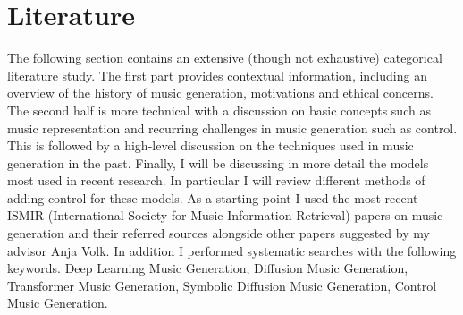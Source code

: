 

\chapter{Literature}
\label{chap:data}
\pagestyle{fancy}

The following section contains an extensive (though not exhaustive) categorical literature study. The first part provides contextual information, including an overview of the history of music generation, motivations and ethical concerns. The second half is more technical with a discussion on basic concepts such as music representation and recurring challenges in music generation such as control. This is followed by a high-level discussion on the techniques used in music generation in the past. Finally, I will be discussing in more detail the models most used in recent research. In particular I will review different methods of adding control for these models.  As a starting point I used the most recent ISMIR (International Society for Music Information Retrieval) papers on music generation and their referred sources alongside other papers suggested by my advisor Anja Volk. In addition I performed systematic searches with the following keywords. Deep Learning Music Generation, Diffusion Music Generation, Transformer Music Generation, Symbolic Diffusion Music Generation, Control Music Generation. 

